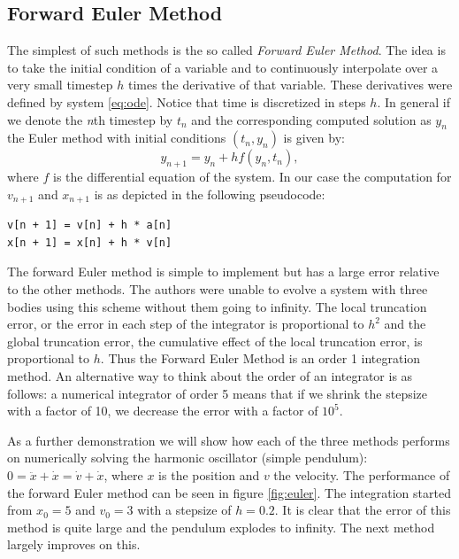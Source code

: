 \documentclass[a4paper]{article}
\begin{document}
\subsection{Forward Euler Method}
The simplest of such methods is the so called \textit{Forward Euler Method}. The idea is to take the
initial condition of a variable and to continuously interpolate over a very small timestep $h$ times
the derivative of that variable. These derivatives were defined by system \ref{eq:ode}. Notice that
time is discretized in steps $h$. In general if we denote the \textit{n}th timestep by $t_{n}$ and
the corresponding computed solution as $y_{n}$ the Euler method with initial conditions
$(t_{n}, y_{n})$ is given by:
\begin{equation}
  y_{n+1} = y_n + h f(y_n, t_n),
\end{equation}
where $f$ is the differential equation of the system. \cite{wiki:euler} In our case the computation
for $v_{n+1}$ and $x_{n+1}$ is as depicted in the following pseudocode:
\begin{verbatim}
v[n + 1] = v[n] + h * a[n]
x[n + 1] = x[n] + h * v[n]
\end{verbatim}
The forward Euler method is simple to implement but has a large error relative to the other methods.
The authors were unable to evolve a system with three bodies using this scheme without them going to
infinity. The local truncation error, or the error in each step of the integrator is proportional to
$h^{2}$ and the global truncation error, the cumulative effect of the local truncation error, is
proportional to $h$. \cite{wiki:euler} Thus the Forward Euler Method is an order 1 integration
method. An alternative way to think about the order of an integrator is as follows: a numerical
integrator of order 5 means that if we shrink the stepsize with a factor of 10, we decrease the
error with a factor of $10^5$.

As a further demonstration we will show how each of the three methods performs on numerically
solving the harmonic oscillator (simple pendulum): $0 = \ddot{x} + \dot{x} = \dot{v} + \dot{x}$,
where $x$ is the position and $v$ the velocity. The performance of the forward Euler method can be
seen in figure \ref{fig:euler}. The integration started from $x_{0}=5$ and $v_{0}=3$ with a stepsize
of $h=0.2$. It is clear that the error of this method is quite large and the pendulum explodes to
infinity. The next method largely improves on this.
\end{document}

